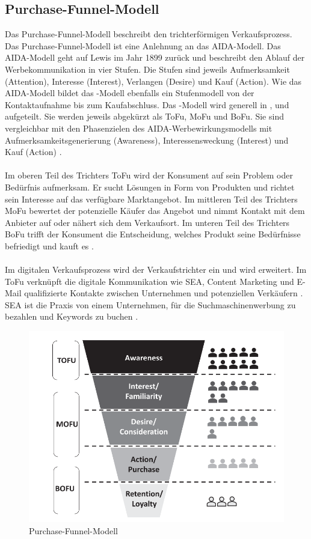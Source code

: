 \subsection{Purchase-Funnel-Modell}
\label{PurchaseFunnelModell}
Das Purchase-Funnel-Modell beschreibt den trichterförmigen Verkaufsprozess. Das Purchase-Funnel-Modell ist eine Anlehnung an das AIDA-Modell. Das AIDA-Modell geht auf Lewis im Jahr 1899 zurück und beschreibt den Ablauf der Werbekommunikation in vier Stufen. Die Stufen sind jeweils Aufmerksamkeit (Attention), Interesse (Interest), Verlangen (Desire) und Kauf (Action). Wie das AIDA-Modell bildet das -Modell ebenfalls ein Stufenmodell von der Kontaktaufnahme bis zum Kaufabschluss. Das -Modell wird generell in ,  und  aufgeteilt. Sie werden jeweils abgekürzt als \ac{ToFu}, \ac{MoFu} und \ac{BoFu}. Sie sind vergleichbar mit den Phasenzielen des AIDA-Werbewirkungsmodells mit Aufmerksamkeitsgenerierung (Awareness), Interessensweckung (Interest) und Kauf (Action) \cite{Kleinjohann2024}. \\\\
Im oberen Teil des Trichters \ac{ToFu} wird der Konsument auf sein Problem oder Bedürfnis aufmerksam. Er sucht Lösungen in Form von Produkten und richtet sein Interesse auf das verfügbare Marktangebot. Im mittleren Teil des Trichters \ac{MoFu} bewertet der potenzielle Käufer das Angebot und nimmt Kontakt mit dem Anbieter auf oder nähert sich dem Verkaufsort. Im unteren Teil des Trichters \ac{BoFu} trifft der Konsument die Entscheidung, welches Produkt seine Bedürfnisse befriedigt und kauft es \cite{Kleinjohann2024}.\\\\
Im digitalen Verkaufsprozess wird der Verkaufstrichter ein  und wird erweitert. Im \ac{ToFu} verknüpft die digitale Kommunikation wie \ac{SEA}, Content Marketing und E-Mail qualifizierte Kontakte zwischen Unternehmen und potenziellen Verkäufern \cite{Kleinjohann2024}. \ac{SEA} ist die Praxis von einem Unternehmen, für die Suchmaschinenwerbung zu bezahlen und Keywords zu buchen \cite{Bartholomew2005MakingAM}. 
\begin{figure}[H]
    \centering
    \includegraphics[width=0.75\linewidth]{images/Funnel.png}
    \caption{Purchase-Funnel-Modell \cite{Kleinjohann2024}}
    \label{fig:purchase-funnel}
\end{figure}
